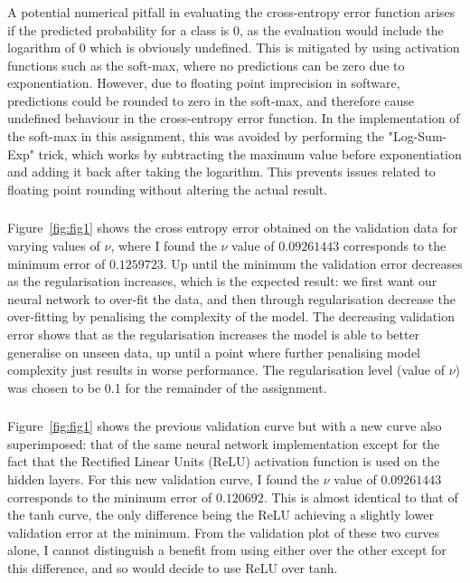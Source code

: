 \documentclass[12pt]{article}
\begin{document}
\newpage
\subsubsection{}
A potential numerical pitfall in evaluating the cross-entropy error function arises if the predicted probability for a class is 0, as the evaluation would include the logarithm of 0 which is obviously undefined. This is mitigated by using activation functions such as the soft-max, where no predictions can be zero due to exponentiation. However, due to floating point imprecision in software, predictions could be rounded to zero in the soft-max, and therefore cause undefined behaviour in the cross-entropy error function. In the implementation of the soft-max in this assignment, this was avoided by performing the "Log-Sum-Exp" trick, which works by subtracting the maximum value before exponentiation and adding it back after taking the logarithm. This prevents issues related to floating point rounding without altering the actual result.

\subsubsection{}
Figure~\ref{fig:fig1} shows the cross entropy error obtained on the validation data for varying values of \( \nu \), where I found the \( \nu \) value of \( 0.09261443 \) corresponds to the minimum error of \( 0.1259723 \). Up until the minimum the validation error decreases as the regularisation increases, which is the expected result: we first want our neural network to over-fit the data, and then through regularisation decrease the over-fitting by penalising the complexity of the model. The decreasing validation error shows that as the regularisation increases the model is able to better generalise on unseen data, up until a point where further penalising model complexity just results in worse performance. The regularisation level (value of \( \nu \)) was chosen to be 0.1 for the remainder of the assignment. 


\subsubsection{}
Figure~\ref{fig:fig1} shows the previous validation curve but with a new curve also superimposed: that of the same neural network implementation except for the fact that the Rectified Linear Units (ReLU) activation function is used on the hidden layers. For this new validation curve, I found the $\nu$ value of $0.09261443$ corresponds to the minimum error of $0.120692$. This is almost identical to that of the tanh curve, the only difference being the ReLU achieving a slightly lower validation error at the minimum. From the validation plot of these two curves alone, I cannot distinguish a benefit from using either over the other except for this difference, and so would decide to use ReLU over tanh.
\end{document}
